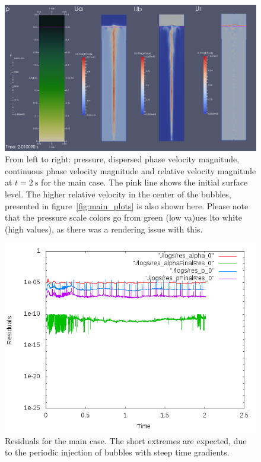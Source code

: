 \documentclass[11pt, a4paper, twoside]{article}
\begin{document}
\begin{figure}
    \centering
    \includegraphics[width=\textwidth]{figures/main/main_p_U}
    \caption{From left to right: pressure, dispersed phase velocity magnitude, continuous phase velocity magnitude and relative velocity magnitude at $t=\SI{2}{\second}$ for the main case. The pink line shows the initial surface level. The higher relative velocity in the center of the bubbles, presented in figure~\ref{fig:main_plots} is also shown here. Please note that the pressure scale colors go from green (low va)ues lto white (high values), as there was a rendering issue with this.}
    \label{fig:main_p_U}
\end{figure}

\begin{figure}
    \centering
    \includegraphics[width=\textwidth]{figures/main/Residuals}
    \caption{Residuals for the main case. The short extremes are expected, due to the periodic injection of bubbles with steep time gradients.}
    \label{fig:main_residuals}
\end{figure}
\end{document}
